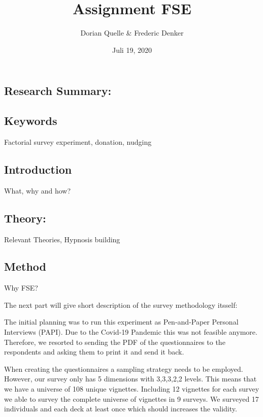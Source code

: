 \documentclass[12pt,]{article}
\title{Assignment FSE}
\author{Dorian Quelle \& Frederic Denker}
\date{Juli 19, 2020}
\begin{document}
\maketitle

\hypertarget{research-summary}{%
\subsection{Research Summary:}\label{research-summary}}

\hypertarget{keywords}{%
\subsection{Keywords}\label{keywords}}

Factorial survey experiment, donation, nudging

\newpage

\hypertarget{introduction}{%
\subsection{Introduction}\label{introduction}}

What, why and how?

\hypertarget{theory}{%
\subsection{Theory:}\label{theory}}

Relevant Theories, Hypnosis building

\hypertarget{method}{%
\subsection{Method}\label{method}}

Why FSE?

The next part will give short description of the survey methodology
itsself:

The initial planning was to run this experiment as Pen-and-Paper
Personal Interviews (PAPI). Due to the Covid-19 Pandemic this was not
feasible anymore. Therefore, we resorted to sending the PDF of the
questionnaires to the respondents and asking them to print it and send
it back.

When creating the questionnaires a sampling strategy needs to be
employed. However, our survey only has 5 dimensions with 3,3,3,2,2
levels. This means that we have a universe of 108 unique vignettes.
Including 12 vignettes for each survey we able to survey the complete
universe of vignettes in 9 surveys. We surveyed 17 individuals and each
deck at least once which should increases the validity.
\end{document}
